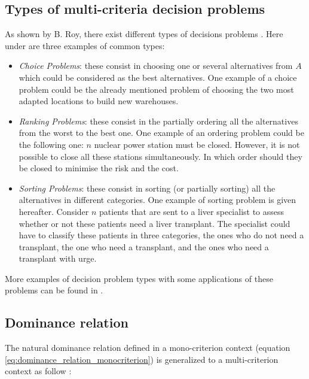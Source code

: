 \subsection{Types of multi-criteria decision problems} \label{sec:type_of_pb}
As shown by B. Roy, there exist different types of decisions problems \cite{Bertrand2002}. Here under are three examples of common types:
\begin{itemize}
    \item \textit{ Choice Problems}: these consist in choosing one or several alternatives from $A$ which could be considered as the best alternatives. One example of a choice problem could be the already mentioned problem of choosing the two most adapted locations to build new warehouses.
    \item \textit{ Ranking Problems}: these consist in the partially ordering all the alternatives from the worst to the best one. One example of an ordering problem could be the following one: $n$ nuclear power station must be closed. However, it is not possible to close all these stations simultaneously. In which order should they be closed to minimise the risk and the cost.
    \item \textit{ Sorting Problems}: these consist in sorting (or partially sorting) all the alternatives in different categories. One example of sorting problem is given hereafter.
Consider $n$ patients that are sent to a liver specialist to assess whether or not these patients need a liver transplant. The specialist could have to classify these patients in three categories, the ones who do not need a transplant, the one who need a transplant, and the ones who need a transplant with urge.
\end{itemize}

More examples of decision problem types with some applications of these problems can be found in \cite{DeSmet2013}.

\subsection{Dominance relation} \label{sec:multi_criteria_dominance_rel}

The natural dominance relation defined in a mono-criterion context (equation \ref{eq:dominance_relation_monocriterion}) is generalized to a multi-criterion context as follow \cite{Bertrand2002}:

